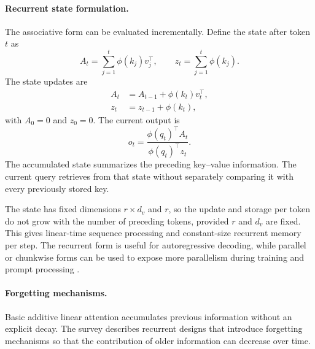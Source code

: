 \paragraph{Recurrent state formulation.}
The associative form can be evaluated incrementally. Define the state
after token \(t\) as
\begin{equation}
    A_t
    =
    \sum_{j=1}^{t}\phi(k_j)v_j^\top,
    \qquad
    z_t
    =
    \sum_{j=1}^{t}\phi(k_j).
    \label{eq:attn-linear-recurrent-state}
\end{equation}
The state updates are
\begin{align}
    A_t&=A_{t-1}+\phi(k_t)v_t^\top,
    \label{eq:attn-linear-state-update}\\
    z_t&=z_{t-1}+\phi(k_t),
    \label{eq:attn-linear-normalizer-update}
\end{align}
with \(A_0=0\) and \(z_0=0\). The current output is
\begin{equation}
    o_t
    =
    \frac{\phi(q_t)^\top A_t}
         {\phi(q_t)^\top z_t}.
    \label{eq:attn-linear-recurrent-output}
\end{equation}
The accumulated state summarizes the preceding key--value information.
The current query retrieves from that state without separately comparing
it with every previously stored key.

The state has fixed dimensions \(r\times d_v\) and \(r\), so the update
and storage per token do not grow with the number of preceding tokens,
provided \(r\) and \(d_v\) are fixed. This gives linear-time sequence
processing and constant-size recurrent memory per step. The recurrent
form is useful for autoregressive decoding, while parallel or chunkwise
forms can be used to expose more parallelism during training and prompt
processing \parencite{sun2026efficientattention}.

\paragraph{Forgetting mechanisms.}
Basic additive linear attention accumulates previous information without
an explicit decay. The survey describes recurrent designs that introduce
forgetting mechanisms so that the contribution of older information can
decrease over time.

